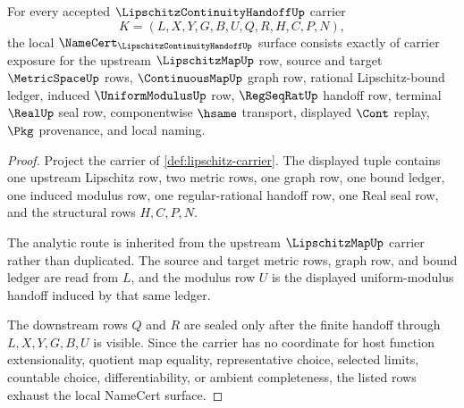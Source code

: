 \begin{theorem}
\label{thm:lipschitz-namecert-obligations}
For every accepted $\LipschitzContinuityHandoffUp$ carrier
$$
K=(L,X,Y,G,B,U,Q,R,H,C,P,N),
$$
the local $\NameCert_{\LipschitzContinuityHandoffUp}$ surface consists exactly of carrier exposure for the upstream $\LipschitzMapUp$ row, source and target $\MetricSpaceUp$ rows, $\ContinuousMapUp$ graph row, rational Lipschitz-bound ledger, induced $\UniformModulusUp$ row, $\RegSeqRatUp$ handoff row, terminal $\RealUp$ seal row, componentwise $\hsame$ transport, displayed $\Cont$ replay, $\Pkg$ provenance, and local naming.
\end{theorem}
\begin{proof}
Project the carrier of \autoref{def:lipschitz-carrier}. The displayed tuple contains one upstream Lipschitz row, two metric rows, one graph row, one bound ledger, one induced modulus row, one regular-rational handoff row, one Real seal row, and the structural rows $H,C,P,N$.

The analytic route is inherited from the upstream $\LipschitzMapUp$ carrier rather than duplicated. The source and target metric rows, graph row, and bound ledger are read from $L$, and the modulus row $U$ is the displayed uniform-modulus handoff induced by that same ledger.

The downstream rows $Q$ and $R$ are sealed only after the finite handoff through $L,X,Y,G,B,U$ is visible. Since the carrier has no coordinate for host function extensionality, quotient map equality, representative choice, selected limits, countable choice, differentiability, or ambient completeness, the listed rows exhaust the local NameCert surface.
\end{proof}

